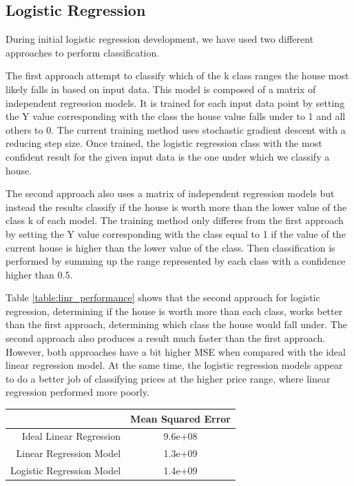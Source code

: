 \documentclass[10pt]{article}
\begin{document}
\begin{multicols}{2}
		\subsection{Logistic Regression}
			During initial logistic regression development, we have used two different approaches to perform classification.
		\par
			The first approach attempt to classify which of the k class ranges the house most likely falls in based on input data. This model is composed of a matrix of independent regression models. It is trained for each input data point by setting the Y value corresponding with the class the house value falls under to 1 and all others to 0. The current training method uses stochastic gradient descent with a reducing step size. Once trained, the logistic regression class with the most confident result for the given input data is the one under which we classify a house.
		\par
	 		The second approach also uses a matrix of independent regression models but instead the results classify if the house is worth more than the lower value of the class k of each model. The training method only differes from the first approach by setting the Y value corresponding with the class equal to 1 if the value of the current house is higher than the lower value of the class. Then classification is performed by summing up the range represented by each class with a confidence higher than 0.5.
		\par
 			Table \ref{table:linr_performance} shows that the second approach for logistic regression, determining if the house is worth more than each class, works better than the first approach, determining which class the house would fall under. The second approach also produces a result much faster than the first approach. However, both approaches have a bit higher MSE when compared with the ideal linear regression model. At the same time, the logistic regression models appear to do a better job of classifying prices at the higher price range, where linear regression performed more poorly.
		\par
        	\captionsetup{type=table}
			\begin{tabular}{r|c}
				& \small{Mean Squared Error} \\
				\hline
				\small{Ideal Linear Regression} & \small{9.6e+08} \\
				\hline
				\small{Linear Regression Model} & \small{1.3e+09} \\
				\hline
				\small{Logistic Regression Model} & \small{1.4e+09} \\

\end{tabular}
\end{multicols}
\end{document}
